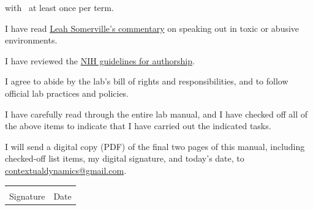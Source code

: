 \documentclass{tufte-book} %
\begin{document}
\begin{todolist}
    with \director~at least once per term.
  \item I have read \href{https://www.sciencemag.org/careers/2018/11/what-can-we-learn-dartmouth}{Leah Somerville's commentary} on speaking
    out in toxic or abusive environments.
  \item I have reviewed the
    \href{https://oir.nih.gov/sites/default/files/uploads/sourcebook/documents/ethical_conduct/guidelines-authorship_contributions.pdf}{NIH
      guidelines for authorship}.
  \item I agree to abide by the lab's bill of rights and
    responsibilities, and to follow official lab practices and
    policies.
  \item I have carefully read through the entire lab manual, and I have
    checked off all of the above items to indicate that I have carried
    out the indicated tasks.
  \item I will send a digital copy (PDF) of the final two pages of
    this manual, including checked-off list items, my digital
    signature, and today's date, to \href{mailto:contextualdynamics@gmail.com}{contextualdynamics@gmail.com}.
\end{todolist}

\vspace{1in}
\begin{tabular}{@{}p{3in}p{1in}@{}}
\hrulefill & \hrulefill \\
Signature & Date\\
\end{tabular}







\end{document}
